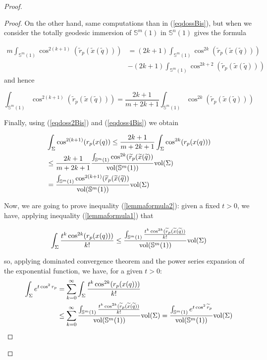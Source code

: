 \documentclass{amsart}
\theoremstyle{definition}
\theoremstyle{remark}
\newcommand{\ese}{\mathbb{S}}
\begin{document}
\begin{proof}
\begin{proof}
On the other hand, same computations than in (\ref{eqdossBis}), but when we consider the totally geodesic immersion of $\ese^m(1)$ in $\ese^n(1)$ gives the formula

\begin{equation}\label{eqdoss3Bis}
\begin{aligned}
m\int_{\ese^m(1)} \cos^{2(k+1)}(\widetilde{r}_p(\widetilde{x}(\widetilde{q})))&=(2k+1)\int_{\ese^m(1)}\cos^{2k}(\widetilde{r}_p(\widetilde{x}(\widetilde{q})))\\&-(2k+1)\int_{\ese^m(1)} \cos^{2k+2}(\widetilde{r}_p(\widetilde{x}(\widetilde{q})))
\end{aligned}
\end{equation}
\noindent and hence

\begin{equation}\label{eqdoss4Bis}
\int_{\ese^m(1)} \cos^{2(k+1)}(\widetilde{r}_p(\widetilde{x}(\widetilde{q})))=\frac{2k+1}{m+2k+1}\int_{\ese^m(1)}\cos^{2k}(\widetilde{r}_p(\widetilde{x}(\widetilde{q})))
\end{equation}

Finally, using (\ref{eqdoss2Bis}) and (\ref{eqdoss4Bis}) we obtain


\begin{equation}\label{eqdoss5Bis}
\begin{aligned}
&\int_\Sigma \cos^{2(k+1)}(r_p(x(q))\leq \frac{2k+1}{m+2k+1}\int_\Sigma \cos^{2k}(r_p(x(q)))\\ & \leq  \frac{2k+1}{m+2k+1}\frac{\int_{\mathbb{S}^m(1)} \cos^{2k}(\widetilde{r}_p(\widetilde{x}(\widetilde{q}))}{{\rm vol}(\mathbb{S}^m(1))} {\rm vol}(\Sigma)\\&=\frac{\int_{\mathbb{S}^m(1)} \cos^{2(k+1)}(\widetilde{r}_p(\widetilde{x}(\widetilde{q}))}{{\rm vol}(\mathbb{S}^m(1))} {\rm vol}(\Sigma)
\end{aligned}
\end{equation}

\medskip

Now, we are going to prove inequality (\ref{lemmaformula2}): given a fixed $t>0$, we have, applying inequality (\ref{lemmaformula1}) that

$$\int_\Sigma\frac{t^k \cos^{2k}(r_p(x(q)))}{k!} \leq \frac{\int_{\mathbb{S}^m(1)}\frac{t^k \cos^{2k}(\widetilde{r}_p(\widetilde{x}(\widetilde{q}))}{k!}}{{\rm vol}(\mathbb{S}^m(1))} {\rm vol}(\Sigma)$$

\noindent so, applying dominated convergence theorem and the power series expansion of the exponential function, we have, for a given $t>0$:
$$
\begin{aligned}
\int_{\Sigma} e^{t \cos^2r_p} &=\sum_{k=0}^\infty \int_\Sigma\frac{t^k \cos^{2k}(r_p(x(q)))}{k!} \\&\leq 
\sum_{k=0}^\infty \frac{\int_{\mathbb{S}^m(1)}\frac{t^k \cos^{2k}(\widetilde{r}_p(\widetilde{x}(\widetilde{q}))}{k!}}{{\rm vol}(\mathbb{S}^m(1))} {\rm vol}(\Sigma)=\frac{\int_{\ese^m(1)} e^{t \cos^2\widetilde{r}_p}}{{\rm vol}(\mathbb{S}^m(1))} {\rm vol}(\Sigma)
\end{aligned}
$$


\end{proof}
\end{proof}
\end{document}

